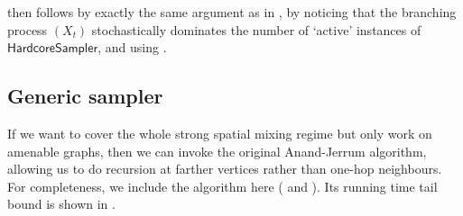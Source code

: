 \documentclass[11pt]{amsart}
\renewcommand{\Pr}{\mathop{\mathrm{Pr}}\nolimits}
\theoremstyle{definition}
\theoremstyle{remark}
\newcommand{\hcsampler}{\mathsf{HardcoreSampler}}
\begin{document}
 then follows by exactly the same argument as in \cite[Proof of Lemma B.10]{FGWWY22}, by noticing that the branching process $(X_t)$ stochastically dominates the number of `active' instances of $\hcsampler$, and using . 


\subsection{Generic sampler}

If we want to cover the whole strong spatial mixing regime but only work on amenable graphs, then we can invoke the original Anand-Jerrum algorithm, allowing us to do recursion at farther vertices rather than one-hop neighbours. 
For completeness, we include the algorithm here ( and ). 
Its running time tail bound is shown in \cite[Lemma B.10]{FGWWY22}. 
\end{document}
